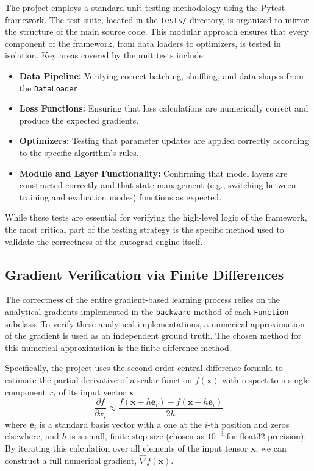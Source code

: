 \documentclass[a4paper]{article}
\begin{document}
The project employs a standard unit testing methodology using the Pytest framework. The test suite, located in the \texttt{tests/} directory, is organized to mirror the structure of the main source code. This modular approach ensures that every component of the framework, from data loaders to optimizers, is tested in isolation. Key areas covered by the unit tests include:

\begin{itemize}
    \item \textbf{Data Pipeline:} Verifying correct batching, shuffling, and data shapes from the \texttt{DataLoader}.
    \item \textbf{Loss Functions:} Ensuring that loss calculations are numerically correct and produce the expected gradients.
    \item \textbf{Optimizers:} Testing that parameter updates are applied correctly according to the specific algorithm's rules.
    \item \textbf{Module and Layer Functionality:} Confirming that model layers are constructed correctly and that state management (e.g., switching between training and evaluation modes) functions as expected.
\end{itemize}

While these tests are essential for verifying the high-level logic of the framework, the most critical part of the testing strategy is the specific method used to validate the correctness of the autograd engine itself.

\subsection{Gradient Verification via Finite Differences}

The correctness of the entire gradient-based learning process relies on the analytical gradients implemented in the \texttt{backward} method of each \texttt{Function} subclass. To verify these analytical implementations, a numerical approximation of the gradient is used as an independent ground truth. The chosen method for this numerical approximation is the finite-difference method.

Specifically, the project uses the second-order central-difference formula to estimate the partial derivative of a scalar function $f(\mathbf{x})$ with respect to a single component $x_i$ of its input vector $\mathbf{x}$:
\begin{equation}
    \frac{\partial f}{\partial x_i} \approx \frac{f(\mathbf{x} + h \mathbf{e}_i) - f(\mathbf{x} - h \mathbf{e}_i)}{2h}
    \label{eq:central_difference}
\end{equation}
where $\mathbf{e}_i$ is a standard basis vector with a one at the $i$-th position and zeros elsewhere, and $h$ is a small, finite step size (chosen as $10^{-3}$ for float32 precision). By iterating this calculation over all elements of the input tensor $\mathbf{x}$, we can construct a full numerical gradient, $\hat{\nabla}f(\mathbf{x})$.
\end{document}
